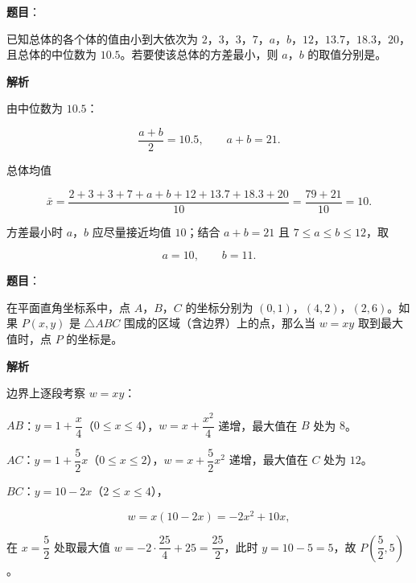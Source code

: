 \begin{answer}

\textbf{题目}：

已知总体的各个体的值由小到大依次为 $2$，$3$，$3$，$7$，$a$，$b$，$12$，$13.7$，$18.3$，$20$，且总体的中位数为 $10.5$。若要使该总体的方差最小，则 $a$，$b$ 的取值分别是\gkblank{}。

\textbf{解析}

由中位数为 $10.5$：

\nopagebreak[4]
\[\frac{a+b}2=10.5,\qquad a+b=21.\]

总体均值

\nopagebreak[4]
\[\bar x=\frac{2+3+3+7+a+b+12+13.7+18.3+20}{10}=\frac{79+21}{10}=10.\]

方差最小时 $a$，$b$ 应尽量接近均值 $10$；结合 $a+b=21$ 且 $7\leqslant a\leqslant b\leqslant12$，取

\nopagebreak[4]
\[a=10,\qquad b=11.\]


\end{answer}
\begin{answer}

\textbf{题目}：

在平面直角坐标系中，点 $A$，$B$，$C$ 的坐标分别为 $(0,1)$，$(4,2)$，$(2,6)$。如果 $P(x,y)$ 是 $\triangle ABC$ 围成的区域（含边界）上的点，那么当 $w=xy$ 取到最大值时，点 $P$ 的坐标是\gkblank{}。

\textbf{解析}

边界上逐段考察 $w=xy$：

$AB$：$y=1+\dfrac x4$（$0\leqslant x\leqslant4$），$w=x+\dfrac{x^2}4$ 递增，最大值在 $B$ 处为 $8$。

$AC$：$y=1+\dfrac52x$（$0\leqslant x\leqslant2$），$w=x+\dfrac52x^2$ 递增，最大值在 $C$ 处为 $12$。

$BC$：$y=10-2x$（$2\leqslant x\leqslant4$），

\nopagebreak[4]
\[w=x(10-2x)=-2x^2+10x,\]

在 $x=\dfrac52$ 处取最大值 $w=-2\cdot\dfrac{25}4+25=\dfrac{25}2$，此时 $y=10-5=5$，故 $P\left(\dfrac52,5\right)$。


\end{answer}
